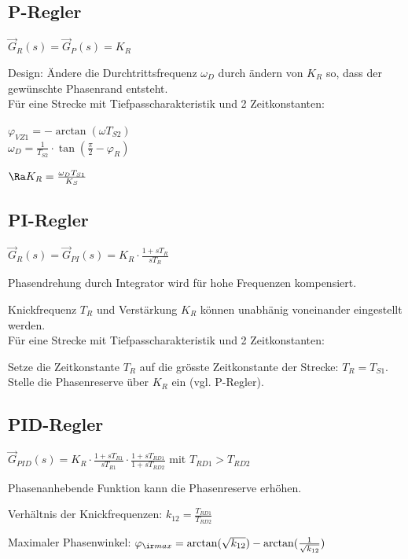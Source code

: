 \documentclass[german]{latex4ei_fs}
\begin{document}
\begin{sectionbox}
\subsection{P-Regler}
$\vec G_R (s) = \vec G_P (s) = K_R$

Design: Ändere die Durchtrittsfrequenz $\omega_D$ durch ändern von $K_R$ so, dass der gewünschte Phasenrand entsteht. \\

Für eine Strecke mit Tiefpasscharakteristik und 2 Zeitkonstanten:

$\varphi_{VZ1} = - \arctan (\omega T_{S2})$ \\
$\omega_D = \frac{1}{T_{S2}} \cdot \tan (\frac{\pi}{2} - \varphi_R)$

$\Ra K_R = \frac{\omega_D T_{S1}}{K_S}$
\end{sectionbox}
\begin{sectionbox}
\subsection{PI-Regler}

$\vec G_R (s) = \vec G_{PI} (s) = K_R \cdot \frac{1 + s T_R}{s T_R}$  

Phasendrehung durch Integrator wird für hohe Frequenzen kompensiert.

Knickfrequenz $T_R$ und Verstärkung $K_R$ können unabhänig voneinander eingestellt werden. \\

Für eine Strecke mit Tiefpasscharakteristik und 2 Zeitkonstanten:

Setze die Zeitkonstante $T_R$ auf die grösste Zeitkonstante der Strecke:
$T_R = T_{S1}$. Stelle die Phasenreserve über $K_R$ ein (vgl. P-Regler).

\end{sectionbox}
\begin{sectionbox}

\subsection{PID-Regler}

$\vec G_{PID} (s) = K_R \cdot \frac{1 + s T_{R1}}{s T_{R1}} \cdot \frac{1 + s T_{RD1}}{1 + s T_{RD2}}$ mit $T_{RD1} > T_{RD2}$ 

Phasenanhebende Funktion kann die Phasenreserve erhöhen.

Verhältnis der Knickfrequenzen: $k_{12} = \frac{T_{RD1}}{T_{RD2}}$

Maximaler Phasenwinkel: $\varphi_{\ir max} = \arctan (\sqrt{ k_{12}}) - \arctan (\frac{1}{\sqrt{k_{12}}})$

\end{sectionbox}
\end{document}

